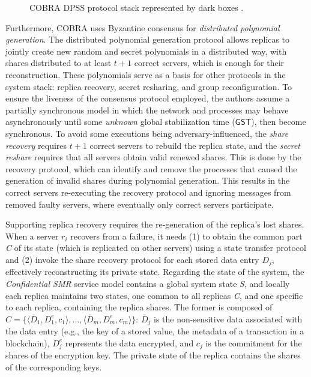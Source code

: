\begin{figure}[h]
    \begin{center}
    \end{center}
    \caption{COBRA DPSS protocol stack represented by dark boxes \cite{cobra}.}
    \label{fig:2.cobra-protocol-stack}
\end{figure}

Furthermore, COBRA uses Byzantine consensus for \textit{distributed polynomial generation}. The distributed polynomial generation protocol allows replicas to jointly create new random and secret polynomials in a distributed way, with shares distributed to at least $t + 1$ correct servers, which is enough for their reconstruction. These polynomials serve as a basis for other protocols in the system stack: replica recovery, secret resharing, and group reconfiguration. To ensure the liveness of the consensus protocol employed, the authors assume a partially synchronous model \cite{partiallysynchronous} in which the network and processes may behave asynchronously until some \textit{unknown} global stabilization time ($\mathsf{GST}$), then become synchronous. To avoid some executions being adversary-influenced, the \textit{share recovery} requires $t + 1$ correct servers to rebuild the replica state, and the \textit{secret reshare} requires that all servers obtain valid renewed shares. This is done by the recovery protocol, which can identify and remove the processes that caused the generation of invalid shares during polynomial generation. This results in the correct servers re-executing the recovery protocol and ignoring messages from removed faulty servers, where eventually only correct servers participate.

Supporting replica recovery requires the re-generation of the replica's lost shares. When a server $r_i$ recovers from a failure, it needs (1) to obtain the common part \textit{C} of its state (which is replicated on other servers) using a state transfer protocol and (2) invoke the share recovery protocol for each stored data entry $D_j$, effectively reconstructing its private state. Regarding the state of the system, the \textit{Confidential SMR} service model contains a global system state \textit{S}, and locally each replica maintains two states, one common to all replicas \textit{C}, and one specific to each replica, containing the replica shares. The former is composed of $C = \{\langle\overline{D}_1, D^e_1, c_1\rangle, ..., \langle\overline{D}_m, D^e_m, c_m\rangle\}$: $\overline{D}_j$ is the non-sensitive data associated with the data entry (e.g., the key of a stored value, the metadata of a transaction in a blockchain), $D^e_j$ represents the data encrypted, and $c_j$ is the commitment for the shares of the encryption key. The private state of the replica contains the shares of the corresponding keys.

